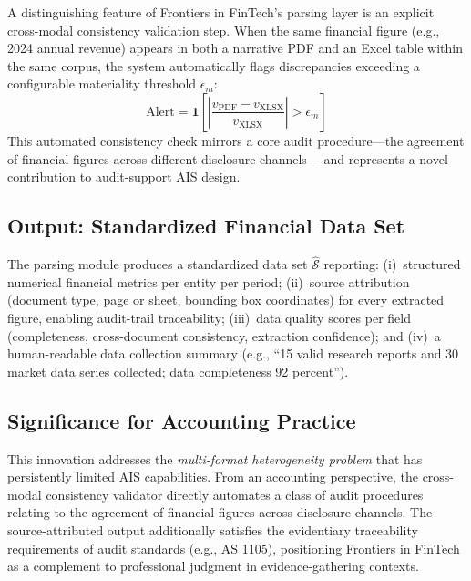 \documentclass[12pt,letterpaper]{article}
\begin{document}
A distinguishing feature of Frontiers in FinTech's parsing layer is an explicit
cross-modal consistency validation step.
When the same financial figure (e.g., 2024 annual revenue) appears in
both a narrative PDF and an Excel table within the same corpus, the
system automatically flags discrepancies exceeding a configurable
materiality threshold $\epsilon_m$:
\begin{equation}
  \text{Alert} = \mathbf{1}\!\left[
    \left|\frac{v_{\text{PDF}} - v_{\text{XLSX}}}{v_{\text{XLSX}}}\right|
    > \epsilon_m
  \right]
  \label{eq:consistency}
\end{equation}
This automated consistency check mirrors a core audit procedure---the
agreement of financial figures across different disclosure channels---
and represents a novel contribution to audit-support AIS design.

\subsection{Output: Standardized Financial Data Set}

The parsing module produces a standardized data set $\hat{\mathcal{S}}$
reporting: (i)~structured numerical financial metrics per entity per
period; (ii)~source attribution (document type, page or sheet, bounding
box coordinates) for every extracted figure, enabling audit-trail
traceability; (iii)~data quality scores per field (completeness,
cross-document consistency, extraction confidence); and
(iv)~a human-readable data collection summary (e.g., ``15 valid
research reports and 30 market data series collected; data completeness
92 percent'').

\subsection{Significance for Accounting Practice}

This innovation addresses the \emph{multi-format heterogeneity problem}
that has persistently limited AIS capabilities.
From an accounting perspective, the cross-modal consistency validator
directly automates a class of audit procedures relating to the agreement
of financial figures across disclosure channels.
The source-attributed output additionally satisfies the evidentiary
traceability requirements of audit standards (e.g., AS 1105), positioning
Frontiers in FinTech as a complement to professional judgment in evidence-gathering
contexts.

\end{document}
